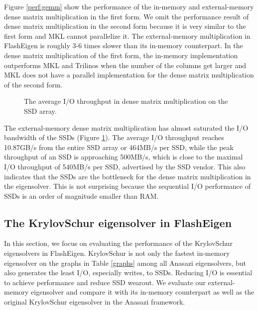 Figure \ref{perf:gemm} show the performance of the in-memory and external-memory
dense matrix multiplication in the first form. We omit the performance result
of dense matrix multiplication in the second form because it is very similar
to the first form and MKL cannot parallelize it.
The external-memory multiplication in FlashEigen is roughly 3-6 times slower
than its in-memory counterpart. In the dense matrix multiplication of
the first form, the in-memory implementation outperforms MKL and Trilinos
when the number of the columns get larger and MKL does not have a parallel
implementation for the dense matrix multiplication of the second form.

\begin{figure}
	\begin{center}
		\footnotesize
		\vspace{-15pt}
		
		\vspace{-15pt}
		\caption{The average I/O throughput in dense matrix multiplication
		on the SSD array.}
		\label{perf:dmm_io}
	\end{center}
\end{figure}

The external-memory dense matrix multiplication has almost saturated
the I/O bandwidth of the SSDs (Figure \ref{perf:dmm_io}). The average
I/O throughput reaches 10.87GB/s from the entire SSD array or 464MB/s
per SSD, while the peak throughput of an SSD is approaching 500MB/s,
which is close to the maximal I/O throughput of 540MB/s per SSD, advertised by
the SSD vendor. This also indicates that the SSDs are the bottleneck for
the dense matrix multiplication in the eigensolver. This is not
surprising because the sequential I/O performance of SSDs is an order of
magnitude smaller than RAM. 

\subsection{The KrylovSchur eigensolver in FlashEigen}
In this section, we focus on evaluating the performance of the KrylovSchur
eigensolvers in FlashEigen. KrylovSchur is not only the fastest in-memory
eigensolver on the graphs in Table \ref{graphs} among all Anasazi eigensolvers,
but also generates the least I/O, especially writes,
to SSDs. Reducing I/O is essential to achieve performance and reduce SSD
wearout. We evaluate our external-memory eigensolver and compare it
with its in-memory counterpart as well as the original KrylovSchur eigensolver
in the Anasazi framework.

